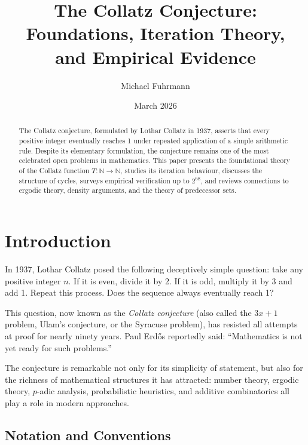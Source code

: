 \documentclass[12pt,a4paper]{article}
\begin{document}
\title{The Collatz Conjecture: Foundations, Iteration Theory,\\
and Empirical Evidence}
\author{Michael Fuhrmann}
\date{March 2026}
\maketitle

\begin{abstract}
The Collatz conjecture, formulated by Lothar Collatz in 1937, asserts that every positive
integer eventually reaches 1 under repeated application of a simple arithmetic rule.
Despite its elementary formulation, the conjecture remains one of the most celebrated
open problems in mathematics. This paper presents the foundational theory of the Collatz
function $T\colon \mathbb{N} \to \mathbb{N}$, studies its iteration behaviour, discusses
the structure of cycles, surveys empirical verification up to $2^{68}$, and reviews
connections to ergodic theory, density arguments, and the theory of predecessor sets.
\end{abstract}

\tableofcontents

\newpage

\section{Introduction}

In 1937, Lothar Collatz posed the following deceptively simple question: take any positive
integer $n$. If it is even, divide it by 2. If it is odd, multiply it by 3 and add 1.
Repeat this process. Does the sequence always eventually reach 1?

This question, now known as the \emph{Collatz conjecture} (also called the $3x+1$
problem, Ulam's conjecture, or the Syracuse problem), has resisted all attempts at
proof for nearly ninety years. Paul Erd\H{o}s reportedly said: ``Mathematics is not yet
ready for such problems.''

The conjecture is remarkable not only for its simplicity of statement, but also for the
richness of mathematical structures it has attracted: number theory, ergodic theory,
$p$-adic analysis, probabilistic heuristics, and additive combinatorics all play a role
in modern approaches.

\subsection{Notation and Conventions}
\end{document}
